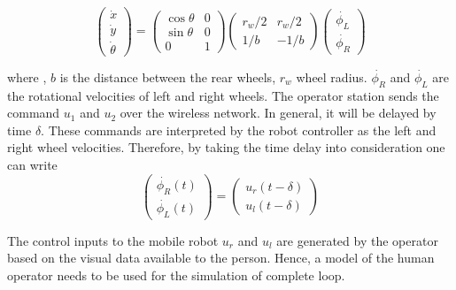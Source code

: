 \begin{equation}
\begin{pmatrix}
\dot{x}\\ 
\dot{y}\\ 
\dot{\theta}
\end{pmatrix}
=
\begin{pmatrix}
\cos \theta & 0 \\
\sin \theta & 0 \\
0& 1
\end{pmatrix}
\begin{pmatrix}
r_w/2 & r_w/2\\
1/b & -1/b
\end{pmatrix}
\begin{pmatrix}
\dot{\phi_L}\\
\dot{\phi_R}
\end{pmatrix}
\end{equation}


where ,  $b$ is the distance between the rear wheels, $r_w$ wheel radius. $\dot{\phi_R}$ and $\dot{\phi_L} $ are the rotational velocities of left and right wheels. 
The operator station sends the command $u_1$ and $u_2$ over the wireless network. In general, it will be delayed by time $\delta$. These commands are interpreted by the robot controller as the left and right wheel velocities.  Therefore, by taking the time delay into consideration one can write
\begin{equation}
\begin{pmatrix}
\dot{\phi_R}(t) \\
 \dot{\phi_L}(t)
\end{pmatrix}
=
\begin{pmatrix}
u_r(t-\delta)\\
u_l(t-\delta)
\end{pmatrix}
\end{equation}

The control inputs to the mobile robot  $u_r$ and $u_l$ are generated by the operator based on the visual data available to the person. Hence, a model of the human operator needs to be used for the simulation of complete loop.


